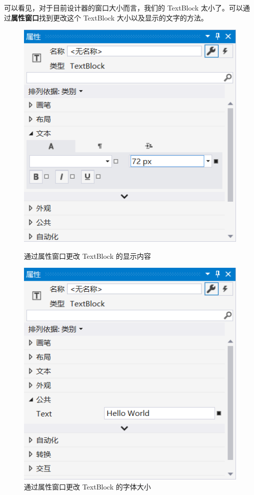 可以看见，对于目前设计器的窗口大小而言，我们的 TextBlock 太小了。可以通过\textbf{属性窗口}找到更改这个 TextBlock 大小以及显示的文字的方法。
\begin{figure}[htbp]
    \centering
    \begin{minipage}[t]{0.4\paperwidth}
        \centering
        \includegraphics[width = 0.3\paperwidth]{pic/11.png}
        \caption{通过属性窗口更改 TextBlock 的显示内容}
    \end{minipage}
    \begin{minipage}[t]{0.4\paperwidth}
        \centering
        \includegraphics[width = 0.3\paperwidth]{pic/12.png}
        \caption{通过属性窗口更改 TextBlock 的字体大小}
    \end{minipage}
\end{figure}

